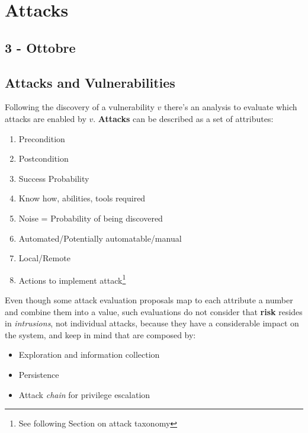 \chapter{Attacks}
\section*{3 - Ottobre}
\section{Attacks and Vulnerabilities}
Following the discovery of a vulnerability $v$ there's an analysis to evaluate which attacks are enabled by $v$.
\textbf{Attacks} can be described as a set of attributes:
\begin{enumerate}
    \item Precondition
    \item Postcondition
    \item Success Probability
    \item Know how, abilities, tools required
    \item Noise = Probability of being discovered
    \item Automated/Potentially automatable/manual
    \item Local/Remote
    \item Actions to implement attack\footnote{See following Section on attack taxonomy}
\end{enumerate}
Even though some attack evaluation proposals map to each attribute a number and combine them into a value,
such evaluations do not consider that \textbf{risk} resides in \textit{intrusions}, not individual attacks, because they have a considerable impact on the system, and keep in mind that are composed by:
\begin{itemize}
    \item Exploration and information collection
    \item Persistence
    \item Attack \textit{chain} for privilege escalation
\end{itemize}

